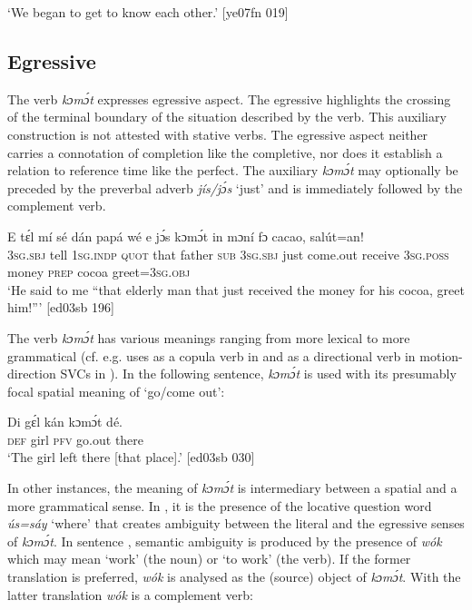\glt ‘We began to get to know each other.’ [ye07fn 019]
\z

\subsection{Egressive}\label{sec:6.4.2}

The verb \textit{kɔmɔ́t} expresses egressive aspect. The egressive highlights the crossing of the terminal boundary of the situation described by the verb. This auxiliary construction is not attested with stative verbs. The egressive aspect neither carries a connotation of completion like the completive, nor does it establish a relation to reference time like the perfect. The auxiliary \textit{kɔmɔ́t} may optionally be preceded by the preverbal adverb \textit{jís/jɔ́s} ‘just’ and is immediately followed by the complement verb. 


\ea%
    \label{ex:key:354}
    \gll E    tɛ́l  mí    sé    dán    papá  wé  e    jɔ́s  kɔmɔ́t
   in    mɔní  fɔ  cacao,  salút=an!\\
\textsc{3sg.sbj}  tell  \textsc{1sg.indp}  \textsc{quot}    that    father  \textsc{sub}  \textsc{3sg.sbj}  just  come.out
receive  \textsc{3sg.poss}  money  \textsc{prep}  cocoa  greet=\textsc{3sg.obj}\\

\glt ‘He said to me “that elderly man that just received the money for his cocoa, 
greet him!”’ [ed03sb 196]
\z

The verb \textit{kɔmɔ́t} has various meanings ranging from more lexical to more grammatical (cf. e.g. uses as a copula verb in  and as a directional verb in motion-direction SVCs in ). In the following sentence, \textit{kɔmɔ́t} is used with its presumably focal spatial meaning of ‘go/come out’: 


\ea%
    \label{ex:key:355}
    \gll Di  gɛ́l  kán  kɔmɔ́t  dé.\\
\textsc{def}  girl  \textsc{pfv}  go.out  there\\

\glt ‘The girl left there [that place].’ [ed03sb 030]
\z

In other instances, the meaning of \textit{kɔmɔ́t} is intermediary between a spatial and a more grammatical sense. In , it is the presence of the locative question word \textit{ús=sáy} ‘where’ that creates ambiguity between the literal and the egressive senses of \textit{kɔmɔ́t}. In sentence , semantic ambiguity is produced by the presence of \textit{wók} which may mean ‘work’ (the noun) or ‘to work’ (the verb). If the former translation is preferred, \textit{wók} is analysed as the (source) object of \textit{kɔmɔ́t}. With the latter translation \textit{wók} is a complement verb:


